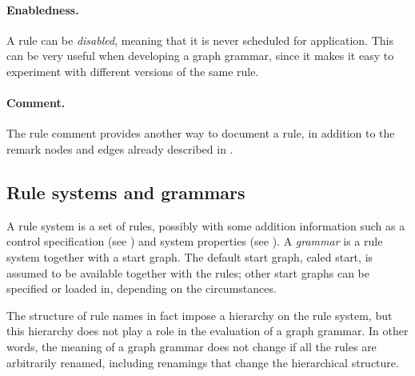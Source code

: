 \paragraph{Enabledness.}

A rule can be \emph{disabled}, meaning that it is never scheduled for
application. This can be very useful when developing a graph grammar, since it
makes it easy to experiment with different versions of the same rule.

\paragraph{Comment.}

The rule comment provides another way to document a rule, in addition to the
remark nodes and edges already described in .

\subsection{Rule systems and grammars}

A rule system is a set of rules, possibly with some addition information such
as a control specification (see ) and system properties (see
). A \emph{grammar} is a rule system together with a
start graph. The default start graph, caled \textsf{start}, is assumed to be
available together with the rules; other start graphs can be specified or
loaded in, depending on the circumstances.

The structure of rule names in fact impose a hierarchy on the rule system, but
this hierarchy does not play a role in the evaluation of a graph grammar. In
other words, the meaning of a graph grammar does not change if all the rules
are arbitrarily renamed, including renamings that change the hierarchical
structure.
